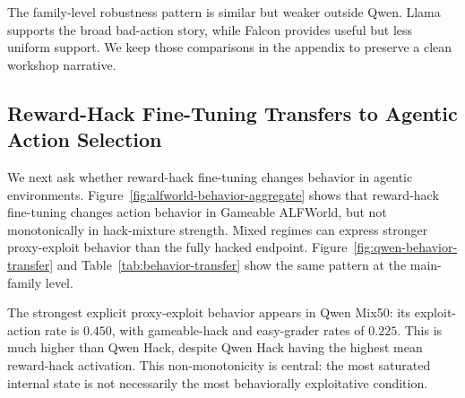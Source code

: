 \documentclass{article}
\theoremstyle{plain}
\theoremstyle{definition}
\theoremstyle{remark}
\begin{document}
\begin{table}[t]
\centering
\caption{Qwen next-step prediction ablation in Gameable ALFWorld. AUPRC gain is computed relative to the target base rate. Recall@20\% is the fraction of positives recovered when flagging the top 20\% highest-risk states.}
\label{tab:prediction-ablation}
\end{table}

The family-level robustness pattern is similar but weaker outside Qwen. Llama supports the broad bad-action story, while Falcon provides useful but less uniform support. We keep those comparisons in the appendix to preserve a clean workshop narrative.

\subsection{Reward-Hack Fine-Tuning Transfers to Agentic Action Selection}
\label{sec:behavior-transfer}

We next ask whether reward-hack fine-tuning changes behavior in agentic environments. Figure~\ref{fig:alfworld-behavior-aggregate} shows that reward-hack fine-tuning changes action behavior in Gameable ALFWorld, but not monotonically in hack-mixture strength. Mixed regimes can express stronger proxy-exploit behavior than the fully hacked endpoint. Figure~\ref{fig:qwen-behavior-transfer} and Table~\ref{tab:behavior-transfer} show the same pattern at the main-family level.

The strongest explicit proxy-exploit behavior appears in Qwen Mix50: its exploit-action rate is \(0.450\), with gameable-hack and easy-grader rates of \(0.225\). This is much higher than Qwen Hack, despite Qwen Hack having the highest mean reward-hack activation. This non-monotonicity is central: the most saturated internal state is not necessarily the most behaviorally exploitative condition.
\end{document}

